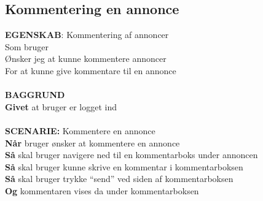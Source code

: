 \subsection{Kommentering en annonce} \label{us:Kommentering}
{\color{blue}\textbf{EGENSKAB}:} Kommentering af annoncer \\
Som bruger \\
Ønsker jeg at kunne kommentere annoncer \\
For at kunne give kommentare til en annonce\\ \\
{\color{blue}\textbf{BAGGRUND}} \\
{\color{blue}\textbf{Givet}} at bruger er logget ind \\
\\
{\color{blue}\textbf{SCENARIE:}} Kommentere en annonce \\
{\color{blue}\textbf{Når}} bruger ønsker at kommentere en annonce
 \\
{\color{blue}\textbf{Så}} skal bruger navigere ned til en kommentarboks under annoncen \\
{\color{blue}\textbf{Så}} skal bruger kunne skrive en kommentar i kommentarboksen\\
{\color{blue}\textbf{Så}} skal bruger trykke “send” ved siden af kommentarboksen \\
{\color{blue}\textbf{Og}} kommentaren vises da under kommentarboksen